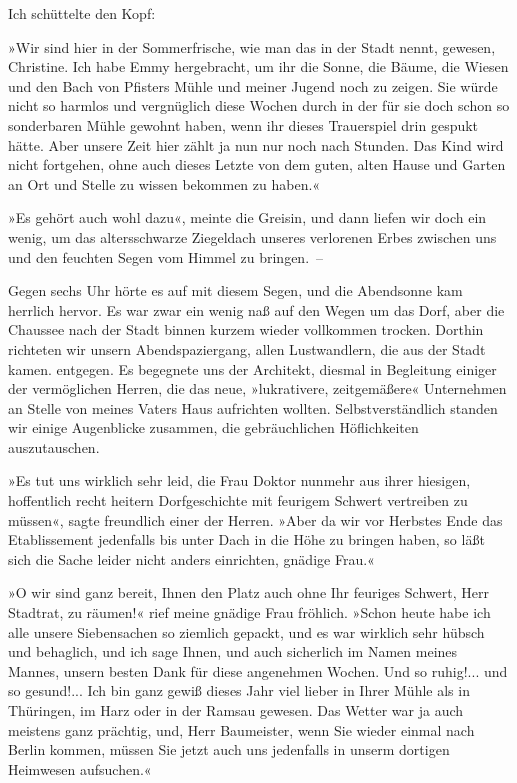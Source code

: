 Ich schüttelte den Kopf:

»Wir sind hier in der Sommerfrische, wie man das in der Stadt
nennt, gewesen, Christine. Ich habe Emmy hergebracht, um ihr die
Sonne, die Bäume, die Wiesen und den Bach von Pfisters Mühle und
meiner Jugend noch zu zeigen. Sie würde nicht so harmlos und
vergnüglich diese Wochen durch in der für sie doch schon so
sonderbaren Mühle gewohnt haben, wenn ihr dieses Trauerspiel drin
gespukt hätte. Aber unsere Zeit hier zählt ja nun nur noch nach
Stunden. Das Kind wird nicht fortgehen, ohne auch dieses Letzte von
dem guten, alten Hause und Garten an Ort und Stelle zu wissen
bekommen zu haben.«

»Es gehört auch wohl dazu«, meinte die Greisin, und dann liefen wir
doch ein wenig, um das altersschwarze Ziegeldach unseres verlorenen
Erbes zwischen uns und den feuchten Segen vom Himmel zu bringen.~–

Gegen sechs Uhr hörte es auf mit diesem Segen, und die Abendsonne
kam herrlich hervor. Es war zwar ein wenig naß auf den Wegen um das
Dorf, aber die Chaussee nach der Stadt binnen kurzem wieder
vollkommen trocken. Dorthin richteten wir unsern Abendspaziergang,
allen Lustwandlern, die aus der Stadt kamen. entgegen. Es begegnete
uns der Architekt, diesmal in Begleitung einiger der vermöglichen
Herren, die das neue, »lukrativere, zeitgemäßere« Unternehmen an
Stelle von meines Vaters Haus aufrichten wollten.
Selbstverständlich standen wir einige Augenblicke zusammen, die
gebräuchlichen Höflichkeiten auszutauschen.

»Es tut uns wirklich sehr leid, die Frau Doktor nunmehr aus ihrer
hiesigen, hoffentlich recht heitern Dorfgeschichte mit feurigem
Schwert vertreiben zu müssen«, sagte freundlich einer der Herren.
»Aber da wir vor Herbstes Ende das Etablissement jedenfalls bis
unter Dach in die Höhe zu bringen haben, so läßt sich die Sache
leider nicht anders einrichten, gnädige Frau.«

»O wir sind ganz bereit, Ihnen den Platz auch ohne Ihr feuriges
Schwert, Herr Stadtrat, zu räumen!« rief meine gnädige Frau
fröhlich. »Schon heute habe ich alle unsere Siebensachen so
ziemlich gepackt, und es war wirklich sehr hübsch und behaglich,
und ich sage Ihnen, und auch sicherlich im Namen meines Mannes,
unsern besten Dank für diese angenehmen Wochen. Und so ruhig!...
und so gesund!... Ich bin ganz gewiß dieses Jahr viel lieber in
Ihrer Mühle als in Thüringen, im Harz oder in der Ramsau gewesen.
Das Wetter war ja auch meistens ganz prächtig, und, Herr
Baumeister, wenn Sie wieder einmal nach Berlin kommen, müssen Sie
jetzt auch uns jedenfalls in unserm dortigen Heimwesen aufsuchen.«

